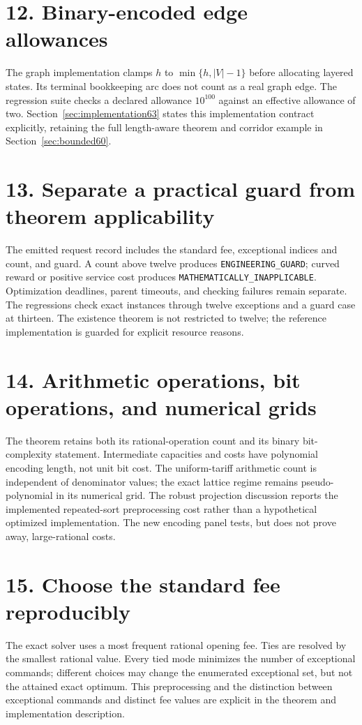 \documentclass[11pt,letterpaper]{article}
\theoremstyle{definition}\newtheorem{remark}[theorem]{Remark}
\begin{document}
\section*{12. Binary-encoded edge allowances}
The graph implementation clamps $h$ to $\min\{h,|V|-1\}$ before allocating layered states. Its terminal bookkeeping arc does not count as a real graph edge. The regression suite checks a declared allowance $10^{100}$ against an effective allowance of two. Section~\ref{sec:implementation63} states this implementation contract explicitly, retaining the full length-aware theorem and corridor example in Section~\ref{sec:bounded60}.

\section*{13. Separate a practical guard from theorem applicability}
The emitted request record includes the standard fee, exceptional indices and count, and guard. A count above twelve produces \texttt{ENGINEERING\_GUARD}; curved reward or positive service cost produces \texttt{MATHEMATICALLY\_INAPPLICABLE}. Optimization deadlines, parent timeouts, and checking failures remain separate. The regressions check exact instances through twelve exceptions and a guard case at thirteen. The existence theorem is not restricted to twelve; the reference implementation is guarded for explicit resource reasons.

\section*{14. Arithmetic operations, bit operations, and numerical grids}
The theorem retains both its rational-operation count and its binary bit-complexity statement. Intermediate capacities and costs have polynomial encoding length, not unit bit cost. The uniform-tariff arithmetic count is independent of denominator values; the exact lattice regime remains pseudo-polynomial in its numerical grid. The robust projection discussion reports the implemented repeated-sort preprocessing cost rather than a hypothetical optimized implementation. The new encoding panel tests, but does not prove away, large-rational costs.

\section*{15. Choose the standard fee reproducibly}
The exact solver uses a most frequent rational opening fee. Ties are resolved by the smallest rational value. Every tied mode minimizes the number of exceptional commands; different choices may change the enumerated exceptional set, but not the attained exact optimum. This preprocessing and the distinction between exceptional commands and distinct fee values are explicit in the theorem and implementation description.
\end{document}
